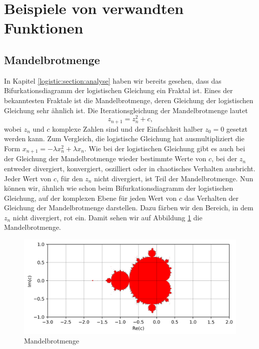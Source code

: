 %
%
%
\section{Beispiele von verwandten Funktionen
\label{logistic:section:beispiele}}
\subsection{Mandelbrotmenge}
In Kapitel \ref{logistic:section:analyse} 
haben wir bereits gesehen, 
dass das Bifurkationsdiagramm der logistischen Gleichung
ein Fraktal ist. 
Eines der bekanntesten Fraktale ist die Mandelbrotmenge,
deren Gleichung der logistischen Gleichung sehr ähnlich ist. 
Die Iterationsgleichung der Mandelbrotmenge lautet
\begin{equation}
    z_{n+1} = z_n^2 + c\text{,}
    \label{eq:mandelbrot}
\end{equation}
wobei $z_n$ und $c$ komplexe Zahlen sind und 
der Einfachkeit halber $z_0 = 0$ gesetzt werden kann.
Zum Vergleich, die logistische Gleichung hat ausmultipliziert
die Form $x_{n+1} = -\lambda x_n^2 +\lambda x_n$. 
Wie bei der logistischen Gleichung gibt es auch
bei der Gleichung der Mandelbrotmenge wieder bestimmte
Werte von $c$, bei der $z_n$ entweder 
divergiert, 
konvergiert, 
oszilliert 
oder in chaotisches Verhalten ausbricht. 
Jeder Wert von $c$, für den $z_n$ nicht 
divergiert, ist Teil der Mandelbrotmenge. 
Nun können wir, ähnlich wie schon beim 
Bifurkationsdiagramm der logistischen Gleichung, auf der
komplexen Ebene für jeden Wert von $c$ das Verhalten
der Gleichung der Mandelbrotmenge darstellen. 
Dazu färben wir den Bereich, in dem $z_n$ 
nicht divergiert, rot ein.
Damit sehen wir auf Abbildung \ref{fig:mandel_2d}
die Mandelbrotmenge. 
\begin{figure}
    \includegraphics[width=\linewidth]{papers/logistic/figures/mandel.png}
    \caption{Mandelbrotmenge}
    \label{fig:mandel_2d}
\end{figure}
